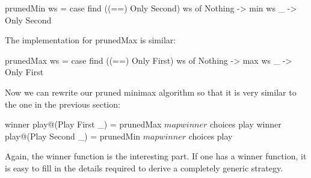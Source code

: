\begin{code}
  prunedMin ws = 
    case find ((==) Only Second) ws of
      Nothing -> min ws
      _ -> Only Second
\end{code}

The implementation for prunedMax is similar:

\begin{code}
  prunedMax ws = 
    case find ((==) Only First) ws of
      Nothing -> max ws
      _ -> Only First
\end{code}


Now we can rewrite our pruned minimax algorithm so that it is very similar to the one in the previous section:

\begin{code}
  winner play@(Play First _) = 
    prunedMax $ map winner $ choices play
  winner play@(Play Second _) = 
    prunedMin $ map winner $ choices play
\end{code}


Again, the winner function is the interesting part. If one has a winner function, it is easy to fill in the details required to derive a completely generic strategy.

